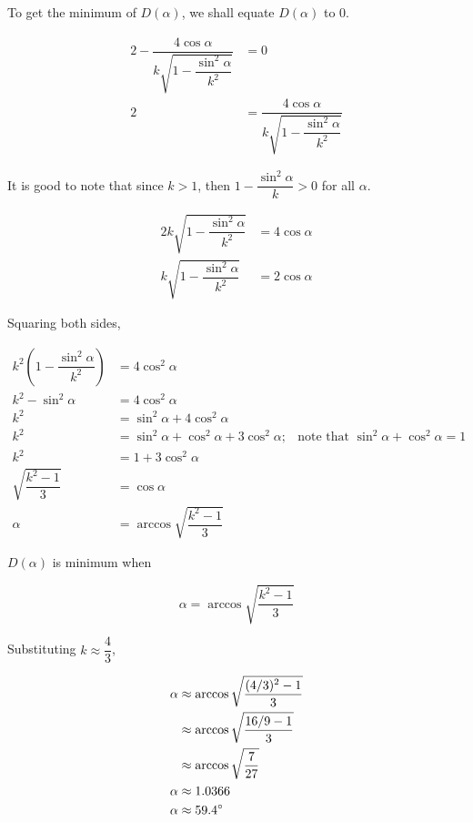 \documentclass[a4paper,12pt]{article}
\begin{document}
To get the minimum of $D(\alpha)$, we shall equate $D(\alpha)$ to $0$.

\begin{align}
2 - \dfrac{4 \cos \alpha}{k \sqrt{1 -  \dfrac{\sin^2 \alpha}{k^2}}} &= 0 \nonumber\\
2 &=  \dfrac{4 \cos \alpha}{k \sqrt{1 -  \dfrac{\sin^2 \alpha}{k^2}}}
\end{align}

It is good to note that since $k>1$, then $1-\dfrac{\sin^2 \alpha}{k} >0$ for all $\alpha$.

\begin{align}
2 k \sqrt{1 -  \dfrac{\sin^2 \alpha}{k^2}} &= 4 \cos \alpha \nonumber\\
k \sqrt{1 -  \dfrac{\sin^2 \alpha}{k^2}} &= 2\cos \alpha
\end{align}

Squaring both sides,

\begin{align}
k^2 \left(1 -  \dfrac{\sin^2 \alpha}{k^2} \right) &= 4 \cos^2 \alpha \nonumber\\
k^2 - \sin^2 \alpha &= 4 \cos^2 \alpha \nonumber\\
k^2 &= \sin^2 \alpha + 4 \cos^2 \alpha \nonumber\\
k^2 &= \sin^2 \alpha + \cos^2 \alpha + 3\cos^2 \alpha; & \text{note that } \sin^2 \alpha + \cos^2 \alpha = 1 \nonumber\\
k^2 &= 1 + 3\cos^2 \alpha \nonumber\\
\sqrt{\dfrac{k^2 -1}{3}} &= \cos \alpha \nonumber\\
\alpha &=  \arccos \sqrt{\dfrac{k^2 -1}{3}}
\end{align}

$D(\alpha)$ is minimum when 

\begin{equation}\label{min}
\alpha =  \arccos \sqrt{\dfrac{k^2 -1}{3}}
\end{equation}

Substituting $k \approx \dfrac{4}{3}$,

\begin{align*}
\alpha &\approx  \arccos \sqrt{\dfrac{(4/3 )^2 -1}{3}} \\
&\approx \arccos \sqrt{\dfrac{16/9 -1}{3}}\\
&\approx \arccos \sqrt{\dfrac{7}{27}}\\
\alpha &\approx 1.0366\\
\alpha &\approx 59.4 \degree
\end{align*}
\end{document}
